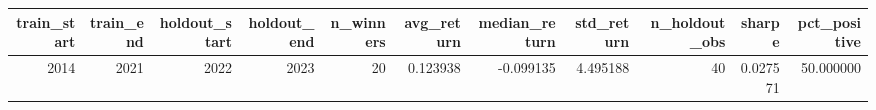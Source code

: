 \begin{tabular}{rrrrrrrrrrr}
\toprule
train_start & train_end & holdout_start & holdout_end & n_winners & avg_return & median_return & std_return & n_holdout_obs & sharpe & pct_positive \\
\midrule
2014 & 2021 & 2022 & 2023 & 20 & 0.123938 & -0.099135 & 4.495188 & 40 & 0.027571 & 50.000000 \\
\bottomrule
\end{tabular}
